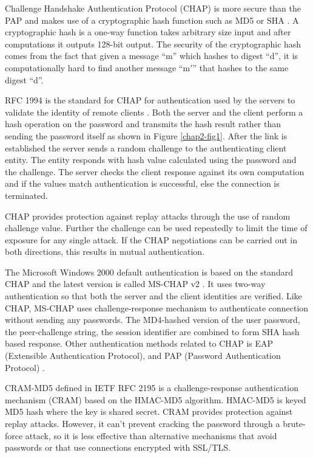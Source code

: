 \begin{multicols}{2}
Challenge Handshake Authentication Protocol (CHAP) is more secure than the PAP and makes use of a cryptographic hash function such as MD5 or SHA \cite{chap2-key1}. A cryptographic hash is a one-way function takes arbitrary size input and after computations it outputs 128-bit output. The security of the cryptographic hash comes from the fact that given a message ``m'' which hashes to digest ``d'', it is computationally hard to find another message ``m$'$'' that hashes to the same digest ``d''.

RFC 1994 is the standard for CHAP for authentication used by the servers to validate the identity of remote clients \cite{chap2-key5}. Both the server and the client perform a hash operation on the password and transmits the hash result rather than sending the password itself as shown in Figure \ref{chap2-fig1}. After the link is established the server sends a random challenge to the authenticating client entity. The entity responds with hash value calculated using the password and the challenge. The server checks the client response against its own computation and if the values match authentication is successful, else the connection is terminated.

CHAP provides protection against replay attacks through the use of random challenge value. Further the challenge can be used repeatedly to limit the time of exposure for any single attack. If the CHAP negotiations can be carried out in both directions, this results in mutual authentication.

The Microsoft Windows 2000 default authentication is based on the standard CHAP and the latest version is called MS-CHAP v2 \cite{chap2-key4}. It uses two-way authentication so that both the server and the client identities are verified. Like CHAP, MS-CHAP uses challenge-response mechanism to authenticate connection without sending any passwords. The MD4-hashed version of the user password, the peer-challenge string, the session identifier are combined to form SHA hash based response. Other authentication methods related to CHAP is EAP (Extensible Authentication Protocol), and PAP (Password Authentication Protocol) \cite{chap2-key4}.

CRAM-MD5 defined in IETF RFC 2195 \cite{chap2-key6} is a challenge-response authentication mechanism (CRAM) based on the HMAC-MD5 algorithm. HMAC-MD5 is keyed MD5 hash where the key is shared secret. CRAM provides protection against replay attacks. However, it can't prevent cracking the password through a brute-force attack, so it is less effective than alternative mechanisms that avoid passwords or that use connections encrypted with SSL/TLS. 


\end{multicols}
